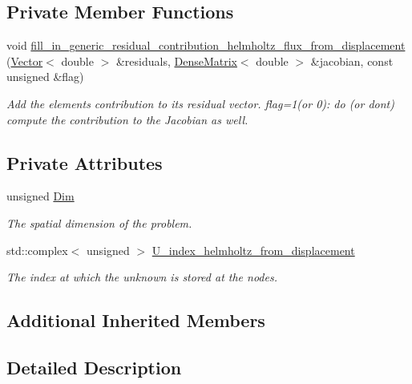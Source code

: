 \subsection*{Private Member Functions}
\begin{DoxyCompactItemize}
\item 
void \hyperlink{classoomph_1_1HelmholtzFluxFromNormalDisplacementBCElement_a66f653fb85249296deb66cc91647cc52}{fill\+\_\+in\+\_\+generic\+\_\+residual\+\_\+contribution\+\_\+helmholtz\+\_\+flux\+\_\+from\+\_\+displacement} (\hyperlink{classoomph_1_1Vector}{Vector}$<$ double $>$ \&residuals, \hyperlink{classoomph_1_1DenseMatrix}{Dense\+Matrix}$<$ double $>$ \&jacobian, const unsigned \&flag)
\begin{DoxyCompactList}\small\item\em Add the element\textquotesingle{}s contribution to its residual vector. flag=1(or 0)\+: do (or don\textquotesingle{}t) compute the contribution to the Jacobian as well. \end{DoxyCompactList}\end{DoxyCompactItemize}
\subsection*{Private Attributes}
\begin{DoxyCompactItemize}
\item 
unsigned \hyperlink{classoomph_1_1HelmholtzFluxFromNormalDisplacementBCElement_a72d189d7598def4ce0ce2aecdc93bcd9}{Dim}
\begin{DoxyCompactList}\small\item\em The spatial dimension of the problem. \end{DoxyCompactList}\item 
std\+::complex$<$ unsigned $>$ \hyperlink{classoomph_1_1HelmholtzFluxFromNormalDisplacementBCElement_a84343ef8842d932061e696fdbd032590}{U\+\_\+index\+\_\+helmholtz\+\_\+from\+\_\+displacement}
\begin{DoxyCompactList}\small\item\em The index at which the unknown is stored at the nodes. \end{DoxyCompactList}\end{DoxyCompactItemize}
\subsection*{Additional Inherited Members}


\subsection{Detailed Description}
